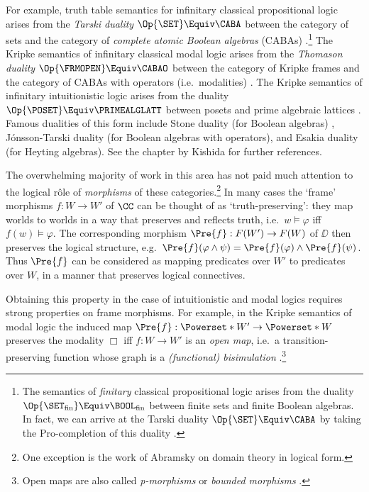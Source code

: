 \documentclass[10pt,a4paper]{article}
\begin{document}
For example, truth table semantics for infinitary classical propositional logic
arises from the \emph{Tarski duality} $\Op{\SET} \Equiv \CABA$ between the
category of sets and the category of \emph{complete atomic Boolean algebras}
(CABAs) \cite[\S 1]{kishida_2018}.\footnote{The semantics of \emph{finitary} classical
  propositional logic arises from the duality 
  \(\Op{\SET_{\text{fin}}} \Equiv \BOOL_{\text{fin}}\)
  between finite sets and finite Boolean algebras. In
  fact, we can arrive at the Tarski duality \(\Op{\SET} \Equiv \CABA\) by taking
the Pro-completion of this duality \cite{kurz_2012}.}
The Kripke semantics of infinitary classical modal logic
\cite{kripke_1963,kripke_1963b} arises from the \emph{Thomason duality}
$\Op{\FRMOPEN} \Equiv \CABAO$ between the category of Kripke frames and the category
of CABAs with operators (i.e.\ modalities) \cite{thomason_1975} \cite[\S
2.4]{kishida_2018}. The Kripke semantics of infinitary intuitionistic logic
\cite{kripke_1965b} arises from the duality $\Op{\POSET} \Equiv \PRIMEALGLATT$
between posets and prime algebraic lattices \cite{nielsen_1981,kavvos_2024a}.
Famous dualities of this form include Stone duality (for Boolean algebras)
\cite{johnstone_1982}, J\'{o}nsson-Tarski duality
\cite{jonsson_1951,hansoul_1983,sambin_1988} (for Boolean algebras with
operators), and Esakia duality \cite{esakia_2019} (for Heyting algebras). See
the chapter by Kishida \cite{kishida_2018} for further references.

The overwhelming majority of work in this area has not paid much attention to
the logical r\^{o}le of \emph{morphisms} of these categories.\footnote{One
exception is the work of Abramsky \cite{abramsky_1991} on domain theory in
logical form.} In many cases the `frame' morphisms $f : W \to W'$ of $\CC$ can
be thought of as `truth-preserving': they map worlds to worlds in a way that
preserves and reflects truth, i.e.\ $w \vDash \varphi$ iff $f(w) \vDash
\varphi$. The corresponding morphism $\Pre{f} : F(W') \to F(W)$ of $\DD$ then
preserves the logical structure, e.g.\ $\Pre{f}(\varphi \land \psi) =
\Pre{f}(\varphi) \land \Pre{f}(\psi)$. Thus $\Pre{f}$ can be considered as
mapping predicates over $W'$ to predicates over $W$, in a manner that
preserves logical connectives.

Obtaining this property in the case of intuitionistic and modal logics requires
strong properties on frame morphisms. For example, in the Kripke semantics of
modal logic the induced map $\Pre{f} : \Powerset*{W'} \to \Powerset*{W}$
preserves the modality $\Box$ iff $f : W \to W'$ is an \emph{open map}, i.e.\ a
transition-preserving function whose graph is a \emph{(functional) bisimulation}
\cite[\S 2.4]{kishida_2018}.\footnote{Open maps are also called
  \emph{p-morphisms} \cite[\S 2.3]{chagrov_1996} or \emph{bounded morphisms}
\cite[\S 2.1]{blackburn_2001}.}
\end{document}
